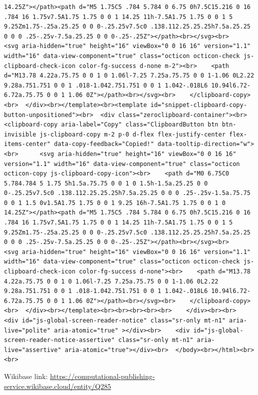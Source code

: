 \documentclass[
  letterpaper,
]{book}
\begin{document}
\begin{verbatim}
14.25Z"></path><path d="M5 1.75C5 .784 5.784 0 6.75 0h7.5C15.216 0 16 .784 16 1.75v7.5A1.75 1.75 0 0 1 14.25 11h-7.5A1.75 1.75 0 0 1 5 9.25Zm1.75-.25a.25.25 0 0 0-.25.25v7.5c0 .138.112.25.25.25h7.5a.25.25 0 0 0 .25-.25v-7.5a.25.25 0 0 0-.25-.25Z"></path><br></svg><br>      <svg aria-hidden="true" height="16" viewBox="0 0 16 16" version="1.1" width="16" data-view-component="true" class="octicon octicon-check js-clipboard-check-icon color-fg-success d-none m-2"><br>    <path d="M13.78 4.22a.75.75 0 0 1 0 1.06l-7.25 7.25a.75.75 0 0 1-1.06 0L2.22 9.28a.751.751 0 0 1 .018-1.042.751.751 0 0 1 1.042-.018L6 10.94l6.72-6.72a.75.75 0 0 1 1.06 0Z"></path><br></svg><br>    </clipboard-copy><br>  </div><br></template><br><template id="snippet-clipboard-copy-button-unpositioned"><br>  <div class="zeroclipboard-container"><br>    <clipboard-copy aria-label="Copy" class="ClipboardButton btn btn-invisible js-clipboard-copy m-2 p-0 d-flex flex-justify-center flex-items-center" data-copy-feedback="Copied!" data-tooltip-direction="w"><br>      <svg aria-hidden="true" height="16" viewBox="0 0 16 16" version="1.1" width="16" data-view-component="true" class="octicon octicon-copy js-clipboard-copy-icon"><br>    <path d="M0 6.75C0 5.784.784 5 1.75 5h1.5a.75.75 0 0 1 0 1.5h-1.5a.25.25 0 0 0-.25.25v7.5c0 .138.112.25.25.25h7.5a.25.25 0 0 0 .25-.25v-1.5a.75.75 0 0 1 1.5 0v1.5A1.75 1.75 0 0 1 9.25 16h-7.5A1.75 1.75 0 0 1 0 14.25Z"></path><path d="M5 1.75C5 .784 5.784 0 6.75 0h7.5C15.216 0 16 .784 16 1.75v7.5A1.75 1.75 0 0 1 14.25 11h-7.5A1.75 1.75 0 0 1 5 9.25Zm1.75-.25a.25.25 0 0 0-.25.25v7.5c0 .138.112.25.25.25h7.5a.25.25 0 0 0 .25-.25v-7.5a.25.25 0 0 0-.25-.25Z"></path><br></svg><br>      <svg aria-hidden="true" height="16" viewBox="0 0 16 16" version="1.1" width="16" data-view-component="true" class="octicon octicon-check js-clipboard-check-icon color-fg-success d-none"><br>    <path d="M13.78 4.22a.75.75 0 0 1 0 1.06l-7.25 7.25a.75.75 0 0 1-1.06 0L2.22 9.28a.751.751 0 0 1 .018-1.042.751.751 0 0 1 1.042-.018L6 10.94l6.72-6.72a.75.75 0 0 1 1.06 0Z"></path><br></svg><br>    </clipboard-copy><br>  </div><br></template><br><br><br><br><br>    </div><br><br>    <div id="js-global-screen-reader-notice" class="sr-only mt-n1" aria-live="polite" aria-atomic="true" ></div><br>    <div id="js-global-screen-reader-notice-assertive" class="sr-only mt-n1" aria-live="assertive" aria-atomic="true"></div><br>  </body><br></html><br><br>
\end{verbatim}

Wikibase link:
\url{https://computational-publishing-service.wikibase.cloud/entity/Q285}
\end{document}
